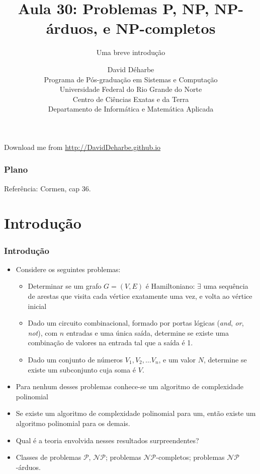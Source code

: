 \documentclass{beamer}
\title{Aula 30: Problemas P, NP, NP-árduos, e NP-completos}
\subtitle{Uma breve introdução}
\author{David Déharbe \\
  Programa de Pós-graduação em Sistemas e Computação \\
  Universidade Federal do Rio Grande do Norte \\
  Centro de Ciências Exatas e da Terra \\
  Departamento de Informática e Matemática Aplicada}
\date{}
\newcommand{\classP}[0]{\ensuremath{\mathcal{P}}\xspace}
\newcommand{\classNP}[0]{\ensuremath{\mathcal{NP}}\xspace}
\begin{document}


\begin{frame}
  \titlepage

  Download me from \url{http://DavidDeharbe.github.io}
\end{frame}

\begin{frame}
  \frametitle{Plano}

  \tableofcontents
Referência: Cormen, cap 36.
\end{frame}

\section{Introdução}


\begin{frame}
\frametitle{Introdução}

\begin{itemize}

\item Considere os seguintes problemas:

\begin{itemize}
\item Determinar se um grafo $G=(V, E)$ é \alert{Hamiltoniano}:
  $\exists$ uma sequência de arestas que visita cada vértice
  exatamente uma vez, e volta ao vértice inicial

\item Dado um circuito combinacional, formado por portas lógicas (\textit{and},
  \textit{or}, \textit{not}), com $n$ entradas e uma única saída, determine se
  existe uma combinação de valores na entrada tal que a saída é 1.

\item Dado um conjunto de números $V_1, V_2, \ldots V_n$, e um valor $N$,
  determine se existe um subconjunto cuja soma é $V$.

\end{itemize}

\item Para nenhum desses problemas conhece-se um algoritmo de complexidade
  polinomial

\item Se existe um algoritmo de complexidade polinomial para um,
  então existe um algoritmo polinomial para os demais.

\item Qual é a teoria envolvida nesses resultados surpreendentes?

\item Classes de problemas \classP, \classNP; problemas
  \classNP-completos; problemas \classNP-árduos.

\end{itemize}

\end{frame}
\end{document}

